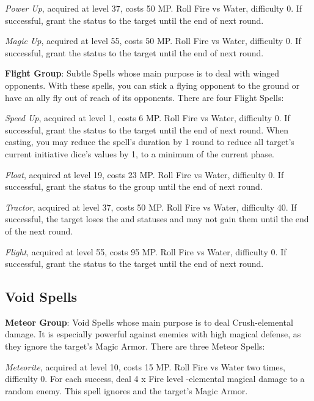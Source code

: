 \begin{multicols}{2}
    \textit{Power Up}, acquired at level 37, costs 50 MP. Roll Fire vs Water, difficulty 0. If successful, grant the  status to the target until the end of next round.
    
    \textit{Magic Up}, acquired at level 55, costs 50 MP. Roll Fire vs Water, difficulty 0. If successful, grant the  status to the target until the end of next round.
    
    \textbf{Flight Group}: Subtle Spells whose main purpose is to deal with winged opponents. With these spells, you can stick a flying opponent to the ground or have an ally fly out of reach of its opponents. There are four Flight Spells:
    
    \textit{Speed Up}, acquired at level 1, costs 6 MP. Roll Fire vs Water, difficulty 0. If successful, grant the  status to the target until the end of next round. When casting, you may reduce the spell's duration by 1 round to reduce all target's current initiative dice's values by 1, to a minimum of the current phase.
    
    \textit{Float}, acquired at level 19, costs 23 MP. Roll Fire vs Water, difficulty 0. If successful, grant the  status to the group until the end of next round.
    
    \textit{Tractor}, acquired at level 37, costs 50 MP. Roll Fire vs Water, difficulty 40. If successful, the target loses the  and  statuses and may not gain them until the end of the next round.
    
    \textit{Flight}, acquired at level 55, costs 95 MP. Roll Fire vs Water, difficulty 0. If successful, grant the  status to the target until the end of next round.
    
    \subsection{Void Spells}

    \textbf{Meteor Group}: Void Spells whose main purpose is to deal Crush-elemental damage. It is especially powerful against enemies with high magical defense, as they ignore the target’s Magic Armor. There are three Meteor Spells:
    
    \textit{Meteorite}, acquired at level 10, costs 15 MP. Roll Fire vs Water two times, difficulty 0. For each success, deal 4 x Fire level -elemental magical damage to a random enemy. This spell ignores  and the target’s Magic Armor.
    

\end{multicols}
